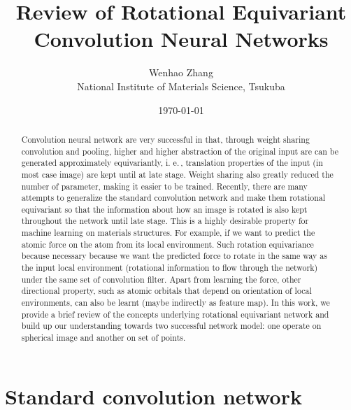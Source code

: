 \documentclass{IEEEtran}
\begin{document}
\title{Review of Rotational Equivariant Convolution Neural Networks}
\author{Wenhao Zhang \\ National Institute of Materials Science, Tsukuba}
\date{\today}

\maketitle

\begin{abstract}
    Convolution neural network are very successful in that, through weight sharing convolution and pooling, higher and higher abstraction 
    of the original input are can be generated approximately equivariantly, i. e.\,, translation properties of the input (in most case image)
    are kept until at late stage. Weight sharing also greatly reduced the number of parameter, making it easier to be trained. 
    Recently, there are many attempts to generalize the standard convolution network and make them rotational equivariant so that the information
    about how an image is rotated is also kept throughout the network until late stage. This is a highly desirable property for machine learning 
    on materials structures. For example, if we want to predict the atomic force on the atom from its local environment. Such rotation equivariance 
    because necessary because we want the predicted force to rotate in the same way as the input local environment 
    (rotational information to flow through the network) under the same set of convolution filter. 
    Apart from learning the force, other directional property, such as atomic orbitals that depend on orientation of local environments, can also 
    be learnt (maybe indirectly as feature map).
    In this work, we provide a brief review of the concepts underlying rotational equivariant network and build up our understanding towards two 
    successful network model: one operate on spherical image and another on set of points.
\end{abstract}

\section{Standard convolution network}
\end{document}
